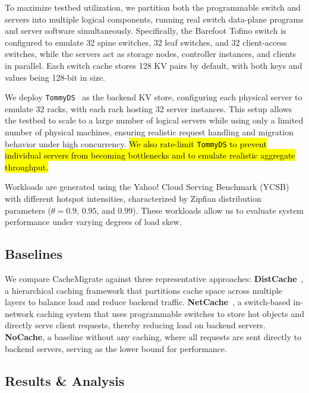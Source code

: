 \documentclass[conference]{IEEEtran}
\DeclareRobustCommand{\hlme}[1]{{\sethlcolor{white}\hl{#1}}}
\begin{document}
To maximize testbed utilization, we partition both the programmable switch and servers into multiple logical components, running real switch data-plane programs and server software simultaneously. Specifically, the Barefoot Tofino switch is configured to emulate 32 spine switches, 32 leaf switches, and 32 client-access switches, while the servers act as storage nodes, controller instances, and clients in parallel. Each switch cache stores 128 KV pairs by default, with both keys and values being 128-bit in size.

We deploy \texttt{TommyDS}~\cite{githubGitHubAmadvancetommyds} as the backend KV store, configuring each physical server to emulate 32 racks, with each rack hosting 32 server instances. This setup allows the testbed to scale to a large number of logical servers while using only a limited number of physical machines, ensuring realistic request handling and migration behavior under high concurrency. \hlme{We also rate-limit \texttt{TommyDS} to prevent individual servers from becoming bottlenecks and to emulate realistic aggregate throughput.}

Workloads are generated using the Yahoo! Cloud Serving Benchmark (YCSB)~\cite{cooper2010benchmarking} with different hotspot intensities, characterized by Zipfian distribution parameters ($\theta = 0.9$, $0.95$, and $0.99$). These workloads allow us to evaluate system performance under varying degrees of load skew.

\subsection{Baselines}

We compare CacheMigrate against three representative approaches:
\textbf{DistCache}~\cite{liu2019distcache}, a hierarchical caching framework that partitions cache space across multiple layers to balance load and reduce backend traffic.
\textbf{NetCache}~\cite{jin2017netcache}, a switch-based in-network caching system that uses programmable switches to store hot objects and directly serve client requests, thereby reducing load on backend servers.
\textbf{NoCache}, a baseline without any caching, where all requests are sent directly to backend servers, serving as the lower bound for performance.


\subsection{Results \& Analysis}
\end{document}
